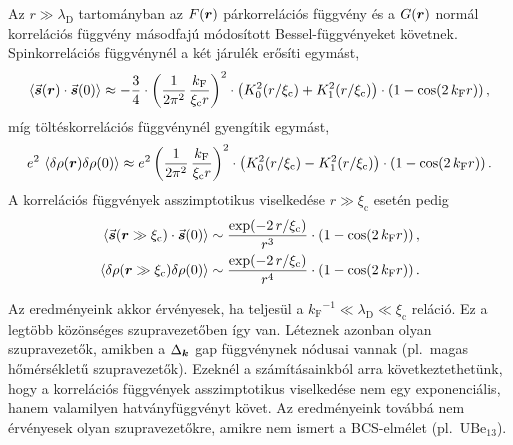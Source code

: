 \documentclass[a4paper,12pt,titlepage]{article}
\newcommand{\KK}{{\vb*{k}}}
\newcommand{\RR}{{\vb*{r}}}
\newcommand{\kF}{{k_\text{F}}}
\newcommand{\xic}{{\xi_\text{c}}}
\begin{document}
Az $r \gg \lambda_\text{D}$ tartományban az $F(\RR)$ párkorrelációs függvény és a $G(\RR)$ normál korrelációs függvény másodfajú módosított Bessel-függvényeket követnek.  Spinkorrelációs függvénynél a két járulék erősíti egymást,
\begin{equation}
	\expval{\va*{s}(\RR) \cdot \va*{s}(0)} \approx -\frac{3}{4} \cdot \left( \frac{1}{2 \pi^2} \, \frac{\kF}{\xic r} \right)^2 \cdot \left( K_0^2(r / \xic) + K_1^2(r / \xic) \right) \cdot \left( 1 - \cos(2 \, \kF r) \right),
\end{equation}
míg töltéskorrelációs függvénynél gyengítik egymást,
\begin{equation}
	e^2 \, \expval{\delta\rho(\RR) \delta\rho(0)} \approx e^2 \left( \frac{1}{2 \pi^2} \, \frac{\kF}{\xic r} \right)^2 \cdot \left( K_0^2(r / \xic) - K_1^2(r / \xic) \right) \cdot \left( 1 - \cos(2 \, \kF r) \right).
\end{equation}
A korrelációs függvények asszimptotikus viselkedése $r \gg \xic$ esetén pedig
\begin{equation}
\begin{split}
	\expval{\va*{s}(\RR \gg \xic) \cdot \va*{s}(0)} & \sim \frac{\exp(-2 \, r / \xic)}{r^3} \cdot \left( 1 - \cos(2 \, \kF r) \right), \\
	\expval{\delta\rho(\RR \gg \xic) \delta\rho(0)} & \sim \frac{\exp(-2 \, r / \xic)}{r^4} \cdot \left( 1 - \cos(2 \, \kF r) \right).
\end{split}
\end{equation}

Az eredményeink akkor érvényesek, ha teljesül a $\kF^{-1} \ll \lambda_\text{D} \ll \xic$ reláció.  Ez a legtöbb közönséges szupravezetőben így van.  Léteznek azonban olyan szupravezetők, amikben a $\Delta_\KK$ gap függvénynek nódusai vannak (pl.\ magas hőmérsékletű szupravezetők).  Ezeknél a számításainkból arra következtethetünk, hogy a korrelációs függvények asszimptotikus viselkedése nem egy exponenciális, hanem valamilyen hatványfüggvényt követ.  Az eredményeink továbbá nem érvényesek olyan szupravezetőkre, amikre nem ismert a BCS-elmélet (pl.\ $\mathrm{U}\mathrm{Be}_{13}$).



\end{document}
